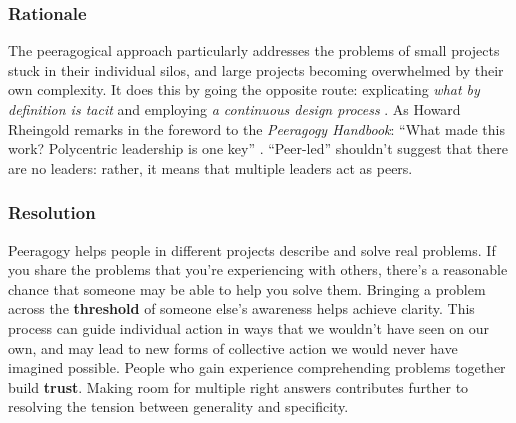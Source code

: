\subsubsection*{Rationale}
The peeragogical approach particularly addresses the problems of small projects stuck in their individual silos, and large projects becoming overwhelmed by their own complexity.  It does this by going the opposite route: explicating \emph{what by definition is tacit} and employing \emph{a continuous design process} \cite[pp. 9--10]{schummer2014beyond}.   As Howard Rheingold remarks in the foreword to the \emph{Peeragogy Handbook}: ``What made this work? Polycentric leadership is one key'' \cite[p.~iii]{peeragogy-handbook}.  ``Peer-led'' shouldn't suggest that there are no leaders: rather, it means that multiple leaders act as peers.

\subsubsection*{Resolution}

Peeragogy helps people in different projects describe and solve real problems. 
If you share the problems that you're experiencing with others, there's a reasonable chance that someone may be able to help you solve them.  Bringing a problem across the \textbf{threshold} of someone else's awareness helps achieve clarity.  
This process can guide individual action in ways that we wouldn't have seen on our own, and may lead to new forms of collective action we would never have imagined possible.  People who gain experience comprehending problems together build \textbf{trust}.
%
Making room for multiple right answers contributes further to resolving the tension between generality and specificity.


